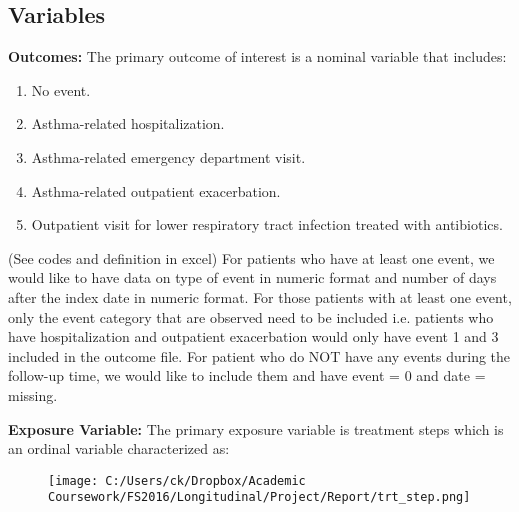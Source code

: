 \documentclass[10pt,a4paper,fleqn]{article}
\begin{document}
\subsection{Variables}
\textbf{Outcomes:}
The primary outcome of interest is a nominal variable that includes:
\begin{enumerate}
  \item No event.
  \item Asthma-related hospitalization.
  \item Asthma-related emergency department visit.
  \item Asthma-related outpatient exacerbation.
  \item Outpatient visit for lower respiratory tract infection treated with antibiotics. 
\end{enumerate}

(See codes and definition in excel)
For patients who have at least one event, we would like to have data on type of event in numeric format and number of days after the index date in numeric format. For those patients with at least one event, only the event category that are observed need to be included i.e. patients who have hospitalization and outpatient exacerbation would only have event 1 and 3 included in the outcome file.
For patient who do NOT have any events during the follow-up time, we would like to include them and have event = 0 and date = missing. 


\textbf{Exposure Variable:}
The primary exposure variable is treatment steps which is an ordinal variable characterized as:
\begin{figure}[!htbp]
\caption{}
\label{}
\texttt{[image: C:/Users/ck/Dropbox/Academic Coursework/FS2016/Longitudinal/Project/Report/trt\_step.png]}
\end{figure}
\end{document}
